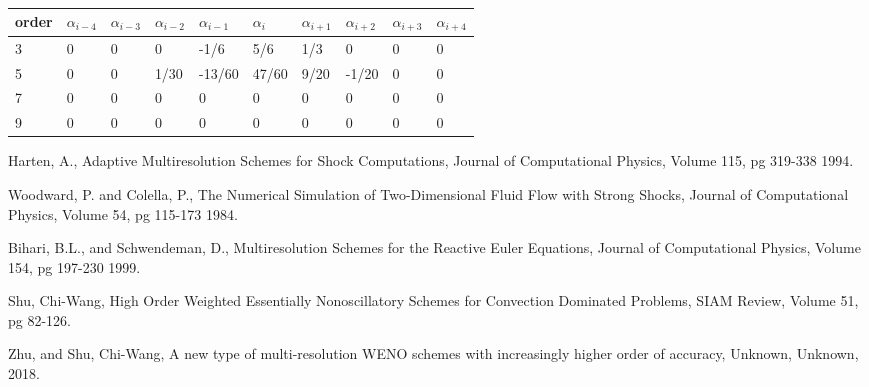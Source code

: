 \documentclass[]{article}
\begin{document}
        \begin{table}[H]
            \center
            \begin{tabular}{|l|l|l|l|l|l|l|l|l|l|}
            \hline
                order & $\alpha_{i-4}$ & $\alpha_{i-3}$ & $\alpha_{i-2}$ &
                $\alpha_{i-1}$ & $\alpha_{i}$ & $\alpha_{i+1}$ & $\alpha_{i+2}$
                & $\alpha_{i+3}$ & $\alpha_{i+4}$ \\ \hline
                3 & 0 & 0 & 0 & -1/6 & 5/6 & 1/3 & 0 & 0 & 0 \\ \hline
                5 & 0 & 0 & 1/30 & -13/60 & 47/60 & 9/20 & -1/20 & 0 & 0 \\ \hline
                7 & 0 & 0 & 0 & 0 & 0 & 0 & 0 & 0 & 0 \\ \hline
                9 & 0 & 0 & 0 & 0 & 0 & 0 & 0 & 0 & 0 \\ \hline
            \end{tabular}
            \label{coeff3}
            \caption{}
        \end{table}

    \begin{thebibliography}{9}

        Harten, A.,
        Adaptive Multiresolution Schemes for Shock Computations,
        Journal of Computational Physics,
        Volume 115, pg 319-338
        1994.

        Woodward, P. and Colella, P.,
        The Numerical Simulation of Two-Dimensional Fluid Flow with Strong Shocks,
        Journal of Computational Physics,
        Volume 54, pg 115-173
        1984.

	    Bihari, B.L., and Schwendeman, D.,
	    Multiresolution Schemes for the Reactive Euler Equations,
	    Journal of Computational Physics,
        Volume 154, pg 197-230
        1999.

        Shu, Chi-Wang,
        High Order Weighted Essentially Nonoscillatory Schemes for Convection Dominated Problems,
        SIAM Review,
        Volume 51, pg 82-126.

        Zhu, and Shu, Chi-Wang,
        A new type of multi-resolution WENO schemes with increasingly higher order of accuracy,
        Unknown,
        Unknown,
        2018.





    \end{thebibliography}
\end{document}
